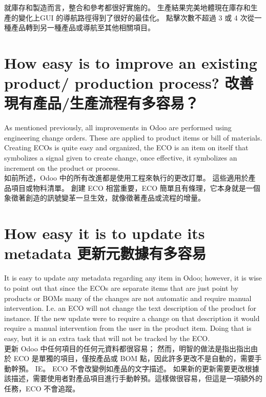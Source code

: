 \fontsize{12pt}{2.5pt}\selectfont
{就庫存和製造而言，整合和參考都很好實施的。 生產結果完美地體現在庫存和生產的變化上GUI 的導航路徑得到了很好的最佳化。 點擊次數不超過 3 或 4 次從一種產品轉到另一種產品或導航至其他相關項目。}\\[1pt]

\section{How easy is to improve an existing product/ production process? 改善現有產品/生產流程有多容易？}
\fontsize{12pt}{2.5pt}\selectfont 
{As mentioned previously, all improvements in Odoo are performed using engineering change orders. These are applied to product items or bill of materials. Creating ECOs is quite easy and organized, the ECO is an item on itself that symbolizes a signal given to create change, once effective, it symbolizes an increment on the product or process.}\\[1pt]

\fontsize{12pt}{2.5pt}\selectfont
{如前所述，Odoo 中的所有改進都是使用工程來執行的更改訂單。 這些適用於產品項目或物料清單。 創建 ECO 相當重要，ECO 簡單且有條理，它本身就是一個象徵著創造的訊號變革一旦生效，就像徵著產品或流程的增量。}\\[1pt]

\section{How easy it is to update its metadata 更新元數據有多容易}
\fontsize{12pt}{2.5pt}\selectfont 
{It is easy to update any metadata regarding any item in Odoo; however, it is wise to point out that since the ECOs are separate items that are just point by products or BOMs many of the changes are not automatic and require manual intervention. I.e. an ECO will not change the text description of the product for instance. If the new update were to require a change on that description it would require a manual intervention from the user in the product item. Doing that is easy, but it is an extra task that will not be tracked by the ECO.  }\\[1pt]

\fontsize{12pt}{2.5pt}\selectfont
{更新 Odoo 中任何項目的任何元資料都很容易； 然而，明智的做法是指出指出由於 ECO 是單獨的項目，僅按產品或 BOM 點，因此許多更改不是自動的，需要手動幹預。 IE。 ECO 不會改變例如產品的文字描述。 如果新的更新需要更改根據該描述，需要使用者對產品項目進行手動幹預。這樣做很容易，但這是一項額外的任務，ECO 不會追蹤。}\\[1pt]

